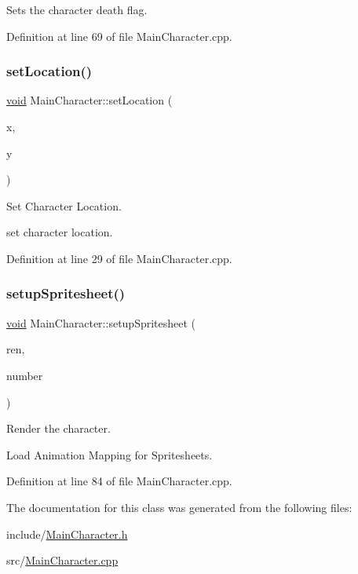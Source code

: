 Sets the character death flag. 



Definition at line 69 of file Main\+Character.\+cpp.

\mbox{\label{class_main_character_a19cd3b43e2e67f317c873aedd8a01906}} 
\subsubsection{\texorpdfstring{setLocation()}{setLocation()}}
{\footnotesize\ttfamily \mbox{\hyperlink{_s_d_l__opengles2__gl2ext_8h_ae5d8fa23ad07c48bb609509eae494c95}{void}} Main\+Character\+::set\+Location (\begin{DoxyParamCaption}\item[{int}]{x,  }\item[{int}]{y }\end{DoxyParamCaption})}



Set Character Location. 

set character location. 

Definition at line 29 of file Main\+Character.\+cpp.

\mbox{\label{class_main_character_a8af26b46fe4d77720ee4af55c1a7e48b}} 
\subsubsection{\texorpdfstring{setupSpritesheet()}{setupSpritesheet()}}
{\footnotesize\ttfamily \mbox{\hyperlink{_s_d_l__opengles2__gl2ext_8h_ae5d8fa23ad07c48bb609509eae494c95}{void}} Main\+Character\+::setup\+Spritesheet (\begin{DoxyParamCaption}\item[{\mbox{\hyperlink{_s_d_l__render_8h_aaf0bf7d020754fc614fe06552ea4d5d4}{S\+D\+L\+\_\+\+Renderer}} $\ast$}]{ren,  }\item[{int}]{number }\end{DoxyParamCaption})}



Render the character. 

Load Animation Mapping for Spritesheets. 

Definition at line 84 of file Main\+Character.\+cpp.



The documentation for this class was generated from the following files\+:\begin{DoxyCompactItemize}
\item 
include/\mbox{\hyperlink{_main_character_8h}{Main\+Character.\+h}}\item 
src/\mbox{\hyperlink{_main_character_8cpp}{Main\+Character.\+cpp}}\end{DoxyCompactItemize}
